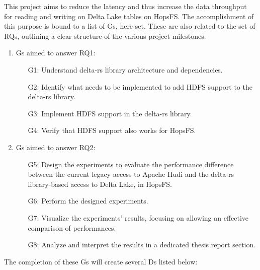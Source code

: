 This project aims to reduce the latency and thus increase the data throughput for reading and writing on Delta Lake tables on \gls{HopsFS}. The accomplishment of this purpose is bound to a list of \glspl{G}, here set. These are also related to the set of \glspl{RQ}, outlining a clear structure of the various project milestones.

\begin{enumerate}
    \item \glspl{G} aimed to answer RQ1: 
        \begin{enumerate}
            \item[G1:] Understand delta-rs library architecture and dependencies.
            \item[G2:] Identify what needs to be implemented to add \gls{HDFS} support to the delta-rs library.  
            \item[G3:] Implement \gls{HDFS} support in the delta-rs library.
            \item[G4:] Verify that \gls{HDFS} support also works for \gls{HopsFS}.
        \end{enumerate}
    \item \glspl{G} aimed to answer RQ2:
        \begin{enumerate}
            \item[G5:] Design the experiments to evaluate the performance difference between the current legacy access to Apache Hudi and the delta-rs library-based access to Delta Lake, in \gls{HopsFS}. 
            \item[G6:] Perform the designed experiments.
            \item[G7:] Visualize the experiments' results, focusing on allowing an effective comparison of performances.
            \item[G8:] Analyze and interpret the results in a dedicated thesis report section.
        \end{enumerate}
\end{enumerate}
The completion of these \glspl{G} will create several \glspl{D} listed below:
